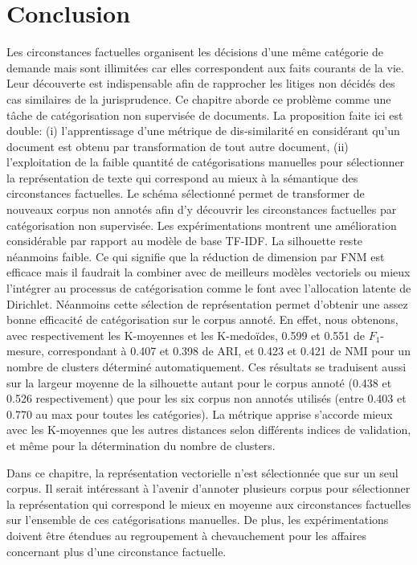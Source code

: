 \section{Conclusion}
\label{sec:similarite:conclusion}
Les circonstances factuelles organisent les décisions d'une même catégorie de demande mais sont illimitées car elles correspondent aux faits courants de la vie. Leur découverte est indispensable afin de rapprocher les litiges non décidés des cas similaires de la jurisprudence.  Ce chapitre aborde ce problème comme une tâche de catégorisation non supervisée de documents. La proposition faite ici est double: (i) l'apprentissage d'une métrique de dis-similarité en considérant qu'un document est obtenu par transformation de tout autre document, (ii) l'exploitation de la faible quantité de catégorisations manuelles  pour sélectionner la représentation de texte qui correspond au mieux à la sémantique des circonstances factuelles. Le schéma sélectionné permet de transformer de nouveaux corpus non annotés afin d'y découvrir les circonstances factuelles par catégorisation non supervisée. Les expérimentations montrent une amélioration considérable par rapport au modèle de base TF-IDF. La silhouette reste néanmoins faible. Ce qui signifie que la réduction de dimension par FNM est efficace mais il faudrait la combiner avec de meilleurs modèles vectoriels ou mieux l'intégrer au processus de catégorisation comme le font \citet{xie2013MGCTM} avec l'allocation latente de Dirichlet. Néanmoins cette sélection de représentation permet d'obtenir une assez bonne efficacité de catégorisation sur le corpus annoté. En effet, nous obtenons, avec respectivement les K-moyennes et les K-medoïdes, 0.599 et 0.551 de $F_1$-mesure, correspondant à 0.407 et 0.398 de ARI, et 0.423 et 0.421 de NMI pour un nombre de clusters déterminé automatiquement. Ces résultats se traduisent aussi sur la largeur moyenne de la silhouette autant pour le corpus annoté (0.438 et 0.526 respectivement) que pour les six corpus non annotés utilisés (entre 0.403 et 0.770 au max pour toutes les catégories). La métrique apprise s'accorde mieux avec les K-moyennes que les autres distances selon différents indices de validation, et même pour la détermination du nombre de clusters.

Dans ce chapitre, la représentation vectorielle n'est sélectionnée que sur un seul corpus. Il serait intéressant à l'avenir d'annoter plusieurs corpus pour sélectionner la représentation qui correspond le mieux en moyenne aux circonstances factuelles sur l'ensemble de ces catégorisations manuelles. De plus, les expérimentations doivent être étendues au regroupement à chevauchement pour les affaires  concernant plus d'une circonstance factuelle.